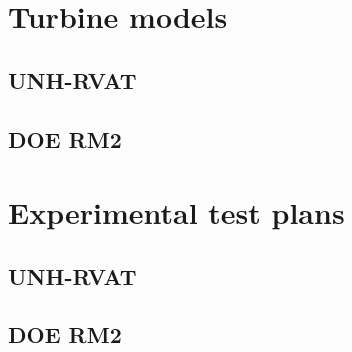 \section{Turbine models}

\subsection{UNH-RVAT}

\subsection{DOE RM2}


\section{Experimental test plans}

\subsection{UNH-RVAT}

\subsection{DOE RM2}